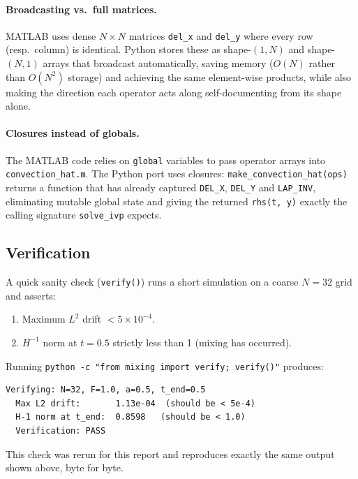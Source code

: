 \documentclass[12pt,a4paper]{article}
\theoremstyle{definition}
\theoremstyle{plain}
\begin{document}
\paragraph{Broadcasting vs.\ full matrices.}
MATLAB uses dense $N\times N$ matrices \texttt{del\_x} and \texttt{del\_y}
where every row (resp.\ column) is identical.
Python stores these as shape-$(1,N)$ and shape-$(N,1)$ arrays that broadcast
automatically, saving memory ($O(N)$ rather than $O(N^2)$ storage) and
achieving the same element-wise products, while also making the direction
each operator acts along self-documenting from its shape alone.

\paragraph{Closures instead of globals.}
The MATLAB code relies on \texttt{global} variables to pass operator arrays
into \texttt{convection\_hat.m}.
The Python port uses closures: \texttt{make\_convection\_hat(ops)} returns a
function that has already captured \texttt{DEL\_X}, \texttt{DEL\_Y} and
\texttt{LAP\_INV}, eliminating mutable global state and giving the returned
\texttt{rhs(t, y)} exactly the calling signature \texttt{solve\_ivp} expects.

\subsection{Verification}

A quick sanity check (\texttt{verify()}) runs a short simulation on a
coarse $N=32$ grid and asserts:

\begin{enumerate}
  \item Maximum $L^2$ drift $< 5\times10^{-4}$.
  \item $H^{-1}$ norm at $t=0.5$ strictly less than 1 (mixing has occurred).
\end{enumerate}

Running \texttt{python -c "from mixing import verify; verify()"} produces:

\begin{lstlisting}[language={}]
Verifying: N=32, F=1.0, a=0.5, t_end=0.5
  Max L2 drift:       1.13e-04  (should be < 5e-4)
  H-1 norm at t_end:  0.8598   (should be < 1.0)
  Verification: PASS
\end{lstlisting}

This check was rerun for this report and reproduces exactly the same
output shown above, byte for byte.
\end{document}

